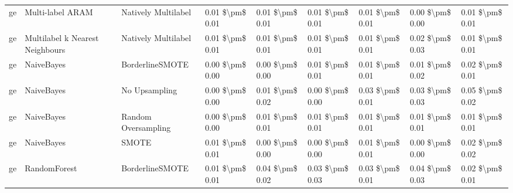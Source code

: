 \begin{tabular}{lllllllll}
      ge &                Multi-label ARAM &           Natively Multilabel & 0.01 \$\textbackslash pm\$ 0.01 &           0.01 \$\textbackslash pm\$ 0.01 &       0.01 \$\textbackslash pm\$ 0.01 &        0.01 \$\textbackslash pm\$ 0.01 &                         0.00 \$\textbackslash pm\$ 0.00 &     0.01 \$\textbackslash pm\$ 0.01 \\
      ge & Multilabel k Nearest Neighbours &           Natively Multilabel & 0.01 \$\textbackslash pm\$ 0.01 &           0.01 \$\textbackslash pm\$ 0.01 &       0.01 \$\textbackslash pm\$ 0.01 &        0.01 \$\textbackslash pm\$ 0.01 &                         0.02 \$\textbackslash pm\$ 0.03 &     0.01 \$\textbackslash pm\$ 0.01 \\
      ge &                      NaiveBayes &               BorderlineSMOTE & 0.00 \$\textbackslash pm\$ 0.00 &           0.00 \$\textbackslash pm\$ 0.00 &       0.01 \$\textbackslash pm\$ 0.01 &        0.01 \$\textbackslash pm\$ 0.01 &                         0.01 \$\textbackslash pm\$ 0.02 &     0.02 \$\textbackslash pm\$ 0.01 \\
      ge &                      NaiveBayes &                 No Upsampling & 0.00 \$\textbackslash pm\$ 0.00 &           0.01 \$\textbackslash pm\$ 0.02 &       0.00 \$\textbackslash pm\$ 0.00 &        0.03 \$\textbackslash pm\$ 0.01 &                         0.03 \$\textbackslash pm\$ 0.03 &     0.05 \$\textbackslash pm\$ 0.02 \\
      ge &                      NaiveBayes &           Random Oversampling & 0.00 \$\textbackslash pm\$ 0.00 &           0.01 \$\textbackslash pm\$ 0.01 &       0.01 \$\textbackslash pm\$ 0.01 &        0.01 \$\textbackslash pm\$ 0.01 &                         0.01 \$\textbackslash pm\$ 0.01 &     0.01 \$\textbackslash pm\$ 0.01 \\
      ge &                      NaiveBayes &                         SMOTE & 0.01 \$\textbackslash pm\$ 0.01 &           0.00 \$\textbackslash pm\$ 0.00 &       0.00 \$\textbackslash pm\$ 0.00 &        0.01 \$\textbackslash pm\$ 0.01 &                         0.00 \$\textbackslash pm\$ 0.00 &     0.02 \$\textbackslash pm\$ 0.02 \\
      ge &                    RandomForest &               BorderlineSMOTE & 0.01 \$\textbackslash pm\$ 0.01 &           0.04 \$\textbackslash pm\$ 0.02 &       0.03 \$\textbackslash pm\$ 0.03 &        0.03 \$\textbackslash pm\$ 0.01 &                         0.04 \$\textbackslash pm\$ 0.03 &     0.02 \$\textbackslash pm\$ 0.01 \\

\end{tabular}
